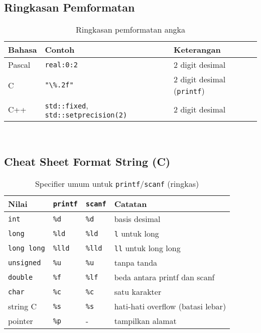 \documentclass[../main.tex]{subfiles}
\begin{document}
\subsection{Ringkasan Pemformatan}
\begin{table}[H]
  \centering
  \caption{Ringkasan pemformatan angka}
  \begin{tabular}{@{}lll@{}}
    \toprule
    Bahasa & Contoh & Keterangan \\
    \midrule
    Pascal & \texttt{real:0:2} & 2 digit desimal \\
    C & \texttt{"\textbackslash\%.2f"} & 2 digit desimal (\texttt{printf}) \\
    C++ & \texttt{std::fixed}, \texttt{std::setprecision(2)} & 2 digit desimal \\
    \bottomrule
  \end{tabular}
  \\\parencite{w3pascal-io,gnu-c-manual,cpp-iomanip}
\end{table}

\subsection{Cheat Sheet Format String (C)}
\begin{table}[H]
  \centering
  \caption{Specifier umum untuk \texttt{printf}/\texttt{scanf} (ringkas)}
  \small
  \begin{tabular}{@{}llll@{}}
    \toprule
    Nilai & \texttt{printf} & \texttt{scanf} & Catatan \\
    \midrule
    \texttt{int} & \texttt{\%d} & \texttt{\%d} & basis desimal \\
    \texttt{long} & \texttt{\%ld} & \texttt{\%ld} & \texttt{l} untuk long \\
    \texttt{long long} & \texttt{\%lld} & \texttt{\%lld} & \texttt{ll} untuk long long \\
    \texttt{unsigned} & \texttt{\%u} & \texttt{\%u} & tanpa tanda \\
    \texttt{double} & \texttt{\%f} & \texttt{\%lf} & beda antara printf dan scanf \\
    \texttt{char} & \texttt{\%c} & \texttt{\%c} & satu karakter \\
    string C & \texttt{\%s} & \texttt{\%s} & hati-hati overflow (batasi lebar) \\
    pointer & \texttt{\%p} & - & tampilkan alamat \\
    \bottomrule
  \end{tabular}
  \\\parencite{c-printf,c-scanf}
\end{table}
\end{document}

